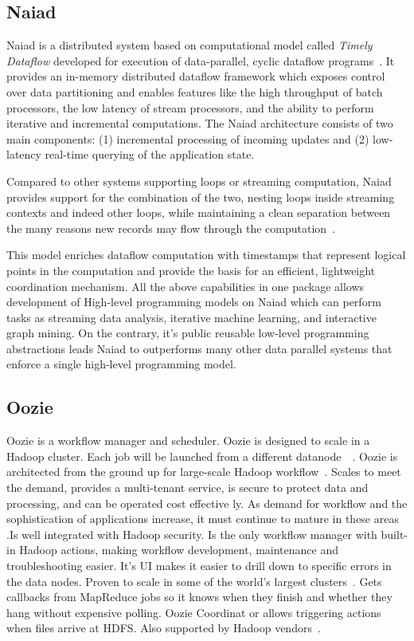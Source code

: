     \pv

    
\subsection{Naiad \vc}

Naiad is a distributed system based on computational model called
\textit{Timely Dataflow} developed for execution of data-parallel,
cyclic dataflow programs~\cite{paper-naiad}.  It provides an in-memory
distributed dataflow framework which exposes control over data
partitioning and enables features like the high throughput of batch
processors, the low latency of stream processors, and the ability to
perform iterative and incremental computations. The Naiad architecture
consists of two main components: (1) incremental processing of
incoming updates and (2) low-latency real-time querying of the
application state.
    
Compared to other systems supporting loops or streaming computation,
Naiad provides support for the combination of the two, nesting loops
inside streaming contexts and indeed other loops, while maintaining a
clean separation between the many reasons new records may flow through
the computation~\cite{www-naiad}.
    
    This model enriches dataflow computation with timestamps that
    represent logical points in the computation and provide the basis
    for an efficient, lightweight coordination mechanism.  All the
    above capabilities in one package allows development of High-level
    programming models on Naiad which can perform tasks as streaming
    data analysis, iterative machine learning, and interactive graph
    mining. On the contrary, it's public reusable low-level
    programming abstractions leads Naiad to outperforms many other
    data parallel systems that enforce a single high-level programming
    model.

    \pv
    
\subsection{Oozie}

Oozie is a workflow manager and scheduler. Oozie is designed to scale
in a Hadoop cluster. Each job will be launched from a different
datanode~\cite{paper-Oozie}~\cite{www-Oozie1}. Oozie is architected
from the ground up for large-scale Hadoop workflow~\cite{www-Oozie2}.
Scales to meet the demand, provides a multi-tenant service, is secure
to protect data and processing, and can be operated cost effective
ly. As demand for workflow and the sophistication of applications
increase, it must continue to mature in these areas
\cite{paper-Oozie}.Is well integrated with Hadoop security. Is the
only workflow manager with built-in Hadoop actions, making workflow
development, maintenance and troubleshooting easier. It’s UI makes it
easier to drill down to specific errors in the data nodes. Proven to
scale in some of the world’s largest clusters~\cite{paper-Oozie}. Gets
callbacks from MapReduce jobs so it knows when they finish and whether
they hang without expensive polling. Oozie Coordinat or allows
triggering actions when files arrive at HDFS. Also supported by Hadoop
vendors~\cite{paper-Oozie}.


